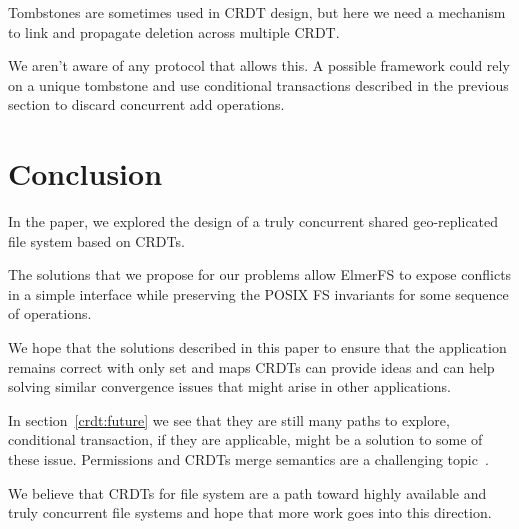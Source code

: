 \documentclass[sigconf,anonymous,10pt]{acmart}
\begin{document}
Tombstones are sometimes used in CRDT design, but here we need a mechanism
to link and propagate deletion across multiple CRDT.

We aren’t aware of any protocol that allows this.
A possible framework could rely on a unique tombstone and use conditional
transactions described in the previous section to discard concurrent
add operations.

\section{Conclusion}

In the paper, we explored the design of a truly concurrent shared geo-replicated
file system based on CRDTs.

The solutions that we propose for our problems allow ElmerFS to expose
conflicts in a simple interface while preserving the POSIX FS invariants
for some sequence of operations.

We hope that the solutions described in this paper to ensure that
the application remains correct with only set and maps CRDTs can provide ideas
and can help solving similar convergence issues that might arise
in other applications.

In section~\ref{crdt:future} we see that they are still many paths to explore,
conditional transaction, if they are applicable, might be a solution to some
of these issue. Permissions and CRDTs merge semantics are a
challenging topic~\cite{yanakieva2021access}.

We believe that CRDTs for file system are a path toward highly available
and truly concurrent file systems and hope that more work
goes into this direction.



\end{document}
